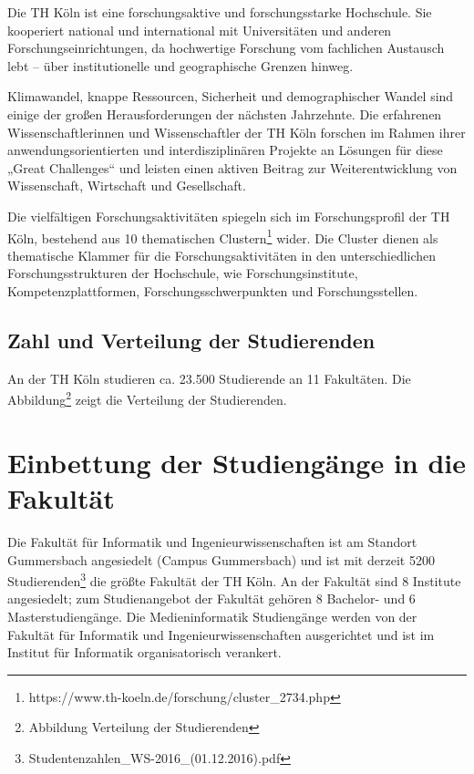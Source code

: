 Die TH Köln ist eine forschungsaktive und forschungsstarke Hochschule.
Sie kooperiert national und international mit Universitäten und anderen
Forschungseinrichtungen, da hochwertige Forschung vom fachlichen
Austausch lebt -- über institutionelle und geographische Grenzen hinweg.

Klimawandel, knappe Ressourcen, Sicherheit und demographischer Wandel
sind einige der großen Herausforderungen der nächsten Jahrzehnte. Die
erfahrenen Wissenschaftlerinnen und Wissenschaftler der TH Köln forschen
im Rahmen ihrer anwendungsorientierten und interdisziplinären Projekte
an Lösungen für diese „Great Challenges`` und leisten einen aktiven
Beitrag zur Weiterentwicklung von Wissenschaft, Wirtschaft und
Gesellschaft.

Die vielfältigen Forschungsaktivitäten spiegeln sich im Forschungsprofil
der TH Köln, bestehend aus 10 thematischen Clustern\footnote{https://www.th-koeln.de/forschung/cluster\_2734.php}
wider. Die Cluster dienen als thematische Klammer für die
Forschungsaktivitäten in den unterschiedlichen Forschungsstrukturen der
Hochschule, wie Forschungsinstitute, Kompetenzplattformen,
Forschungsschwerpunkten und Forschungsstellen.

\subsection{Zahl und Verteilung der
Studierenden}\label{zahl-und-verteilung-der-studierenden}

An der TH Köln studieren ca. 23.500 Studierende an 11 Fakultäten. Die
Abbildung\footnote{Abbildung Verteilung der Studierenden} zeigt die
Verteilung der Studierenden.

\section{Einbettung der Studiengänge in die
Fakultät}\label{einbettung-der-studienguxe4nge-in-die-fakultuxe4t}

Die Fakultät für Informatik und Ingenieurwissenschaften ist am Standort
Gummersbach angesiedelt (Campus Gummersbach) und ist mit derzeit 5200
Studierenden\footnote{Studentenzahlen\_WS-2016\_(01.12.2016).pdf} die
größte Fakultät der TH Köln. An der Fakultät sind 8 Institute
angesiedelt; zum Studienangebot der Fakultät gehören 8 Bachelor- und 6
Masterstudiengänge. Die Medieninformatik Studiengänge werden von der
Fakultät für Informatik und Ingenieurwissenschaften ausgerichtet und ist
im Institut für Informatik organisatorisch verankert.

